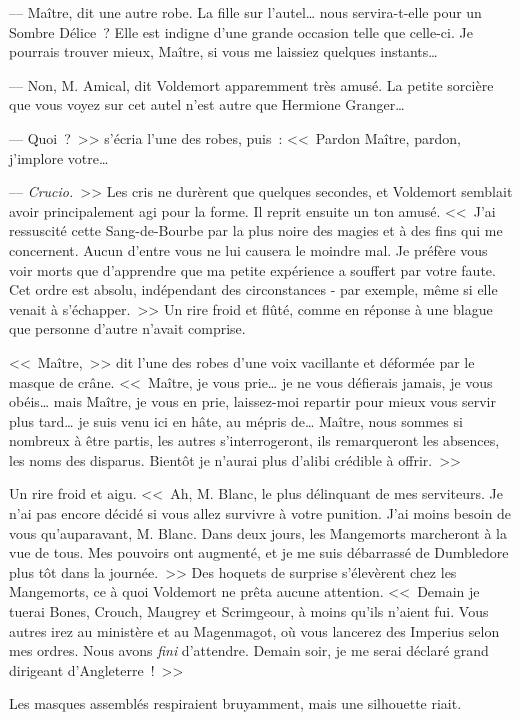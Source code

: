 --- Maître, dit une autre robe. La fille sur l'autel… nous servira-t-elle pour un Sombre Délice~? Elle est indigne d'une grande occasion telle que celle-ci. Je pourrais trouver mieux, Maître, si vous me laissiez quelques instants…

--- Non, M. Amical, dit Voldemort apparemment très amusé. La petite sorcière que vous voyez sur cet autel n'est autre que Hermione Granger…

--- Quoi~?~>> s'écria l'une des robes, puis~: <<~Pardon Maître, pardon, j'implore votre…

--- \emph{Crucio.}~>> Les cris ne durèrent que quelques secondes, et Voldemort semblait avoir principalement agi pour la forme. Il reprit ensuite un ton amusé. <<~J'ai ressuscité cette Sang-de-Bourbe par la plus noire des magies et à des fins qui me concernent. Aucun d'entre vous ne lui causera le moindre mal. Je préfère vous voir morts que d'apprendre que ma petite expérience a souffert par votre faute. Cet ordre est absolu, indépendant des circonstances - par exemple, même si elle venait à s'échapper.~>> Un rire froid et flûté, comme en réponse à une blague que personne d'autre n'avait comprise.

<<~Maître,~>> dit l'une des robes d'une voix vacillante et déformée par le masque de crâne. <<~Maître, je vous prie… je ne vous défierais jamais, je vous obéis… mais Maître, je vous en prie, laissez-moi repartir pour mieux vous servir plus tard… je suis venu ici en hâte, au mépris de… Maître, nous sommes si nombreux à être partis, les autres s'interrogeront, ils remarqueront les absences, les noms des disparus. Bientôt je n'aurai plus d'alibi crédible à offrir.~>>

Un rire froid et aigu. <<~Ah, M. Blanc, le plus délinquant de mes serviteurs. Je n'ai pas encore décidé si vous allez survivre à votre punition. J'ai moins besoin de vous qu'auparavant, M. Blanc. Dans deux jours, les Mangemorts marcheront à la vue de tous. Mes pouvoirs ont augmenté, et je me suis débarrassé de Dumbledore plus tôt dans la journée.~>> Des hoquets de surprise s'élevèrent chez les Mangemorts, ce à quoi Voldemort ne prêta aucune attention. <<~Demain je tuerai Bones, Crouch, Maugrey et Scrimgeour, à moins qu'ils n'aient fui. Vous autres irez au ministère et au Magenmagot, où vous lancerez des Imperius selon mes ordres. Nous avons \emph{fini} d'attendre. Demain soir, je me serai déclaré grand dirigeant d'Angleterre~!~>>

Les masques assemblés respiraient bruyamment, mais une silhouette riait.


